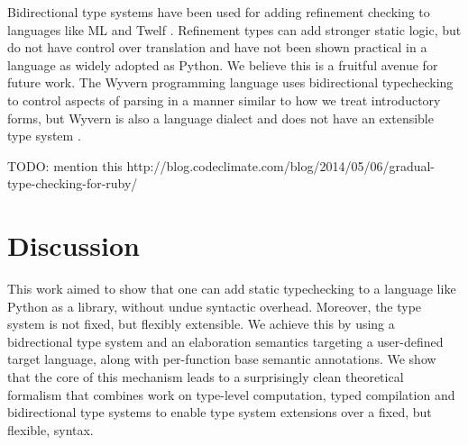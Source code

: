 \documentclass[10pt,preprint]{sigplanconf}
\begin{document}
{Bidirectional type systems have been used for adding refinement checking to languages like ML and Twelf \cite{Lovas08abidirectional}. Refinement types can add stronger static logic, but do not have control over translation and have not been shown practical in a language as widely adopted as Python. We believe this is a fruitful avenue for future work. The Wyvern programming language uses bidirectional typechecking to control aspects of parsing in a manner similar to how we treat introductory forms, but Wyvern is also a language dialect and does not have an extensible type system \cite{Omar:2013:TWP:2489812.2489815}.

TODO: mention this http://blog.codeclimate.com/blog/2014/05/06/gradual-type-checking-for-ruby/

\section{Discussion}\label{discussion}
This work aimed to show that one can add static typechecking to a language like Python as a library, without undue syntactic overhead. Moreover, the type system is not fixed, but flexibly extensible. We achieve this by using a bidrectional type system and an elaboration semantics targeting a user-defined target language, along with per-function base semantic annotations. We show that the core of this mechanism leads to a surprisingly clean theoretical formalism that combines work on type-level computation, typed compilation and bidirectional type systems to enable type system extensions over a fixed, but flexible, syntax.

% 


}
\end{document}
